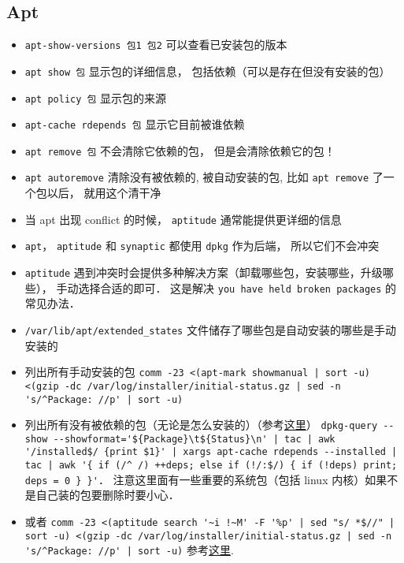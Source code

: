 
\begin{issues}
\issueDraft
\end{issues}

\subsection{Apt}
\begin{itemize}
\item \verb|apt-show-versions 包1 包2| 可以查看已安装包的版本
\item \verb|apt show 包| 显示包的详细信息， 包括依赖（可以是存在但没有安装的包）
\item \verb|apt policy 包| 显示包的来源
\item \verb|apt-cache rdepends 包| 显示它目前被谁依赖
\item \verb|apt remove 包| 不会清除它依赖的包， 但是会清除依赖它的包！
\item \verb|apt autoremove| 清除没有被依赖的, 被自动安装的包, 比如 \verb|apt remove| 了一个包以后， 就用这个清干净
\item 当 apt 出现 conflict 的时候， \verb|aptitude| 通常能提供更详细的信息
\item \verb|apt|， \verb|aptitude| 和 \verb|synaptic| 都使用 \verb|dpkg| 作为后端， 所以它们不会冲突
\item \verb|aptitude| 遇到冲突时会提供多种解决方案（卸载哪些包，安装哪些，升级哪些）， 手动选择合适的即可． 这是解决 \verb|you have held broken packages| 的常见办法．
\item \verb|/var/lib/apt/extended_states| 文件储存了哪些包是自动安装的哪些是手动安装的
\item 列出所有手动安装的包 \verb`comm -23 <(apt-mark showmanual | sort -u) <(gzip -dc /var/log/installer/initial-status.gz | sed -n 's/^Package: //p' | sort -u)`
\item 列出所有没有被依赖的包（无论是怎么安装的）（参考\href{https://askubuntu.com/questions/1114733/how-do-i-list-all-packages-that-no-package-depends-on}{这里}） \verb`dpkg-query --show --showformat='${Package}\t${Status}\n' | tac | awk '/installed$/ {print $1}' | xargs apt-cache rdepends --installed | tac | awk '{ if (/^ /) ++deps; else if (!/:$/) { if (!deps) print; deps = 0 } }'`． 注意这里面有一些重要的系统包（包括 linux 内核）如果不是自己装的包要删除时要小心．
\item 或者 \verb`comm -23 <(aptitude search '~i !~M' -F '%p' | sed "s/ *$//" | sort -u) <(gzip -dc /var/log/installer/initial-status.gz | sed -n 's/^Package: //p' | sort -u)` 参考\href{https://askubuntu.com/questions/2389/how-to-list-manually-installed-packages}{这里}.

\end{itemize}
